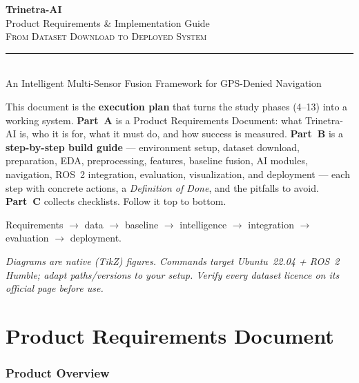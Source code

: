 \documentclass[11pt]{article}
\begin{document}
\begin{titlepage}
\centering
\vspace*{1.8cm}
{\Huge\bfseries\color{accent} Trinetra-AI}\\[8pt]
{\LARGE\color{ink} Product Requirements \& Implementation Guide}\\[22pt]
{\large\color{soft}\textsc{From Dataset Download to Deployed System}}\\[8pt]
\rule{11.5cm}{0.5pt}\\[8pt]
{\normalsize\color{soft} An Intelligent Multi-Sensor Fusion Framework for GPS-Denied Navigation}\\[24pt]

\begin{tcolorbox}[width=12.9cm,colback=defbg,colframe=accent,boxrule=0pt,leftrule=3pt,arc=2pt]
\small
This document is the \textbf{execution plan} that turns the study phases (4--13) into a working
system. \textbf{Part~A} is a Product Requirements Document: what Trinetra-AI is, who it is for,
what it must do, and how success is measured. \textbf{Part~B} is a \textbf{step-by-step build
guide} --- environment setup, dataset download, preparation, EDA, preprocessing, features,
baseline fusion, AI modules, navigation, ROS~2 integration, evaluation, visualization, and
deployment --- each step with concrete actions, a \emph{Definition of Done}, and the pitfalls to
avoid. \textbf{Part~C} collects checklists. Follow it top to bottom.
\end{tcolorbox}
\vfill
{\small\color{soft} Requirements $\rightarrow$ data $\rightarrow$ baseline $\rightarrow$ intelligence $\rightarrow$ integration $\rightarrow$ evaluation $\rightarrow$ deployment.}

\vspace{6pt}
{\footnotesize\color{soft}\itshape Diagrams are native (TikZ) figures. Commands target Ubuntu~22.04 + ROS~2 Humble; adapt paths/versions to your setup. Verify every dataset licence on its official page before use.}
\end{titlepage}

\tableofcontents
\thispagestyle{fancy}
\newpage

\part{Product Requirements Document}

\section{Product Overview}\label{sec:overview}
\end{document}
